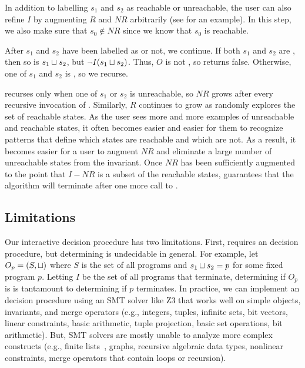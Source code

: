 In addition to labelling $s_1$ and $s_2$ as reachable or unreachable, the user
can also refine $I$ by augmenting $R$ and $NR$ arbitrarily (see
 for an example). In this step, we also make
sure that $s_0 \notin NR$ since we know that $s_0$ is reachable.

After $s_1$ and $s_2$ have been labelled as \sTIreachable{} or not, we
continue. If both $s_1$ and $s_2$ are \sTIreachable{}, then so is $s_1 \sqcup
s_2$, but $\lnot I(s_1 \sqcup s_2)$. Thus, $O$ is not \sTIconfluent{}, so
\Helper{} returns false. Otherwise, one of $s_1$ and $s_2$ is
\sTIunreachable{}, so we recurse.

\Helper{} recurses only when one of $s_1$ or $s_2$ is unreachable, so $NR$
grows after every recursive invocation of \Helper{}. Similarly, $R$ continues
to grow as \Helper{} randomly explores the set of reachable states. As the user
sees more and more examples of unreachable and reachable states, it often becomes
easier and easier for them to recognize patterns that define which states are
reachable and which are not. As a result, it becomes easier for a user to
augment $NR$ and eliminate a large number of unreachable states from the
invariant. Once $NR$ has been sufficiently augmented to the point that $I - NR$
is a subset of the reachable states, 
guarantees that the algorithm will terminate after one more call to \IsIclosed.

\subsection{Limitations}
Our interactive \invariantconfluence{} decision procedure has two
limitations. First,  requires an
\invariantclosure{} decision procedure, but determining \invariantclosure{} is
undecidable in general.
%
For example, let $O_p = (S, \sqcup)$ where $S$ is the set of all programs and
$s_1 \sqcup s_2 = p$ for some fixed program $p$. Letting $I$ be the set of all
programs that terminate, determining if $O_p$ is \Iclosed{} is tantamount to
determining if $p$ terminates.
%
In practice, we can implement an \invariantclosure{} decision procedure using
an SMT solver like Z3 that works well on simple objects, invariants, and merge
operators (e.g., integers, tuples, infinite sets, bit vectors, linear
constraints, basic arithmetic, tuple projection, basic set operations, bit
arithmetic). But, SMT solvers are mostly unable to analyze more complex
constructs (e.g., finite lists~\cite{kroning2009proposal}, graphs, recursive
algebraic data types, nonlinear constraints, merge operators that contain loops
or recursion).

